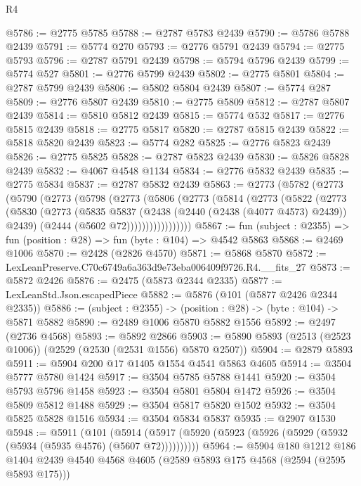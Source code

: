 \begin{lexlean}{R4}
\begin{coremodule}
@5786 := @2775 @5785
@5788 := @2787 @5783 @2439
@5790 := @5786 @5788 @2439
@5791 := @5774 @270
@5793 := @2776 @5791 @2439
@5794 := @2775 @5793
@5796 := @2787 @5791 @2439
@5798 := @5794 @5796 @2439
@5799 := @5774 @527
@5801 := @2776 @5799 @2439
@5802 := @2775 @5801
@5804 := @2787 @5799 @2439
@5806 := @5802 @5804 @2439
@5807 := @5774 @287
@5809 := @2776 @5807 @2439
@5810 := @2775 @5809
@5812 := @2787 @5807 @2439
@5814 := @5810 @5812 @2439
@5815 := @5774 @532
@5817 := @2776 @5815 @2439
@5818 := @2775 @5817
@5820 := @2787 @5815 @2439
@5822 := @5818 @5820 @2439
@5823 := @5774 @282
@5825 := @2776 @5823 @2439
@5826 := @2775 @5825
@5828 := @2787 @5823 @2439
@5830 := @5826 @5828 @2439
@5832 := @4067 @4548 @1134
@5834 := @2776 @5832 @2439
@5835 := @2775 @5834
@5837 := @2787 @5832 @2439
@5863 := @2773
    (@5782
      (@2773
        (@5790
          (@2773
            (@5798
              (@2773
                (@5806
                  (@2773
                    (@5814
                      (@2773
                        (@5822
                          (@2773
                            (@5830
                              (@2773
                                (@5835
                                  @5837
                                  (@2438 (@2440 (@2438 (@4077 @4573) @2439)) @2439)
                                  (@2444 (@5602 @72)))))))))))))))))
@5867 := fun (subject : @2355) => fun (position : @28) => fun (byte : @104) => @4542 @5863
@5868 := @2469 @1006
@5870 := @2428 (@2826 @4570)
@5871 := @5868 @5870
@5872 := LexLeanPreserve.C70c6749a6a363d9e73eba006409f9726.R4.__fits_27
@5873 := @5872 @2426
@5876 := @2475 (@5873 @2344 @2335)
@5877 := LexLeanStd.Json.escapedPiece
@5882 := @5876 (@101 (@5877 @2426 @2344 @2335))
@5886 := (subject : @2355) -> (position : @28) -> (byte : @104) -> @5871 @5882
@5890 := @2489 @1006 @5870 @5882 @1556
@5892 := @2497 (@2736 @4568)
@5893 := @5892 @2866
@5903 := @5890 @5893 (@2513 (@2523 @1006)) (@2529 (@2530 (@2531 @1556) @5870 @2507))
@5904 := @2879 @5893
@5911 := @5904 @200 @17 @1405 @1554 @4541 @5863 @4605
@5914 := @3504 @5777 @5780 @1424
@5917 := @3504 @5785 @5788 @1441
@5920 := @3504 @5793 @5796 @1458
@5923 := @3504 @5801 @5804 @1472
@5926 := @3504 @5809 @5812 @1488
@5929 := @3504 @5817 @5820 @1502
@5932 := @3504 @5825 @5828 @1516
@5934 := @3504 @5834 @5837
@5935 := @2907 @1530
@5948 := @5911
    (@101 (@5914 (@5917 (@5920 (@5923 (@5926 (@5929 (@5932 (@5934 (@5935 @4576) (@5607 @72))))))))))
@5964 := @5904
    @180
    @1212
    @186
    @1404
    @2439
    @4540
    @4568
    @4605
    (@2589 @5893 @175 @4568 (@2594 (@2595 @5893 @175)))

\end{coremodule}
\end{lexlean}
